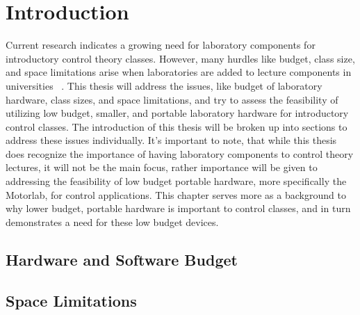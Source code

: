 
\cleardoublepage


\chapter{Introduction}
\label{makereference1}

Current research indicates a growing need for laboratory components for introductory control theory classes. However, many hurdles like budget, class size, and space limitations arise when laboratories are added to lecture components in universities ~\citep{2}. This thesis will address the issues, like budget of laboratory hardware, class sizes, and space limitations, and try to assess the feasibility of utilizing low budget, smaller, and portable laboratory hardware for introductory control classes. The introduction of this thesis will be broken up into sections to address these issues individually. It's important to note, that while this thesis does recognize the importance of having laboratory components to control theory lectures, it will not be the main focus, rather importance will be given to addressing the feasibility of low budget portable hardware, more specifically the Motorlab, for control applications. This chapter serves more as a background to why lower budget, portable hardware is important to control classes, and in turn demonstrates a need for these low budget devices. 

\section{Hardware and Software Budget}
\label{makereference1.1}

\section{Space Limitations}
\label{makereference1.2}